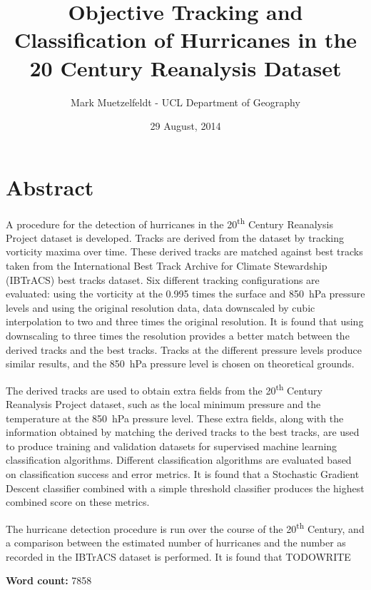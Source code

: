 \documentclass[pdftex,12pt,a4paper]{report}
\title{Objective Tracking and Classification of Hurricanes in the 20\ts{th} Century Reanalysis Dataset}
\author{Mark Muetzelfeldt - UCL Department of Geography}
\date{29 August, 2014}
\newcommand{\ts}{\textsuperscript}
\begin{document}


\clearpage
\thispagestyle{empty}
\null
\addtocounter{page}{-1}%
\newpage

\onehalfspacing
\section*{Abstract}

A procedure for the detection of hurricanes in the 20\ts{th} Century Reanalysis Project dataset is
developed. Tracks are derived from the dataset by tracking vorticity maxima over time. These derived
tracks are matched against best tracks taken from the International Best Track Archive for Climate
Stewardship (IBTrACS) best tracks dataset. Six different tracking configurations are evaluated:
using the vorticity at the 0.995 times the surface and \SI{850}{hPa} pressure levels and using the
original resolution data, data downscaled by cubic interpolation to two and three times the original
resolution. It is found that using downscaling to three times the resolution provides a better match
between the derived tracks and the best tracks. Tracks at the different pressure levels produce
similar results, and the \SI{850}{hPa} pressure level is chosen on theoretical grounds.

The derived tracks are used to obtain extra fields from the 20\ts{th} Century Reanalysis
Project dataset, such as the local minimum pressure and the temperature at the \SI{850}{hPa}
pressure level. These extra fields, along with the information obtained by matching the derived
tracks to the best tracks, are used to produce training and validation datasets for supervised
machine learning classification algorithms. Different classification algorithms are evaluated based
on classification success and error metrics. It is found that a Stochastic Gradient Descent
classifier combined with a simple threshold classifier produces the highest combined score on these
metrics.

The hurricane detection procedure is run over the course of the 20\ts{th} Century, and a comparison
between the estimated number of hurricanes and the number as recorded in the IBTrACS dataset is
performed. It is found that TODOWRITE

\begin{center}
\textbf{Word count:} 7858 %
\end{center}
\end{document}
